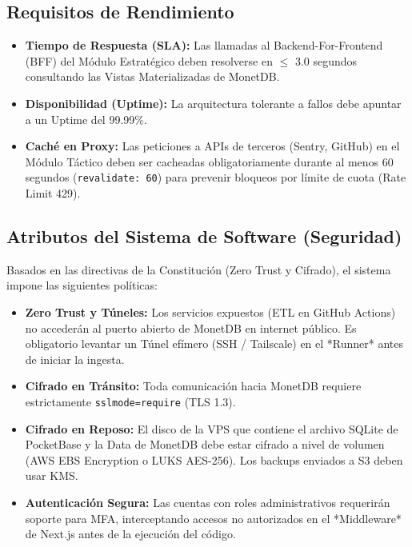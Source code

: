 \documentclass[11pt, letterpaper]{article}
\begin{document}
\subsection{Requisitos de Rendimiento}
\begin{itemize}
    \item \textbf{Tiempo de Respuesta (SLA):} Las llamadas al Backend-For-Frontend (BFF) del Módulo Estratégico deben resolverse en $\leq$ 3.0 segundos consultando las Vistas Materializadas de MonetDB.
    \item \textbf{Disponibilidad (Uptime):} La arquitectura tolerante a fallos debe apuntar a un Uptime del 99.99\%.
    \item \textbf{Caché en Proxy:} Las peticiones a APIs de terceros (Sentry, GitHub) en el Módulo Táctico deben ser cacheadas obligatoriamente durante al menos 60 segundos (\texttt{revalidate: 60}) para prevenir bloqueos por límite de cuota (Rate Limit 429).
\end{itemize}

\subsection{Atributos del Sistema de Software (Seguridad)}
Basados en las directivas de la Constitución (Zero Trust y Cifrado), el sistema impone las siguientes políticas:
\begin{itemize}
    \item \textbf{Zero Trust y Túneles:} Los servicios expuestos (ETL en GitHub Actions) no accederán al puerto abierto de MonetDB en internet público. Es obligatorio levantar un Túnel efímero (SSH / Tailscale) en el *Runner* antes de iniciar la ingesta.
    \item \textbf{Cifrado en Tránsito:} Toda comunicación hacia MonetDB requiere estrictamente \texttt{sslmode=require} (TLS 1.3).
    \item \textbf{Cifrado en Reposo:} El disco de la VPS que contiene el archivo SQLite de PocketBase y la Data de MonetDB debe estar cifrado a nivel de volumen (AWS EBS Encryption o LUKS AES-256). Los backups enviados a S3 deben usar KMS.
    \item \textbf{Autenticación Segura:} Las cuentas con roles administrativos requerirán soporte para MFA, interceptando accesos no autorizados en el *Middleware* de Next.js antes de la ejecución del código.
\end{itemize}
\end{document}
